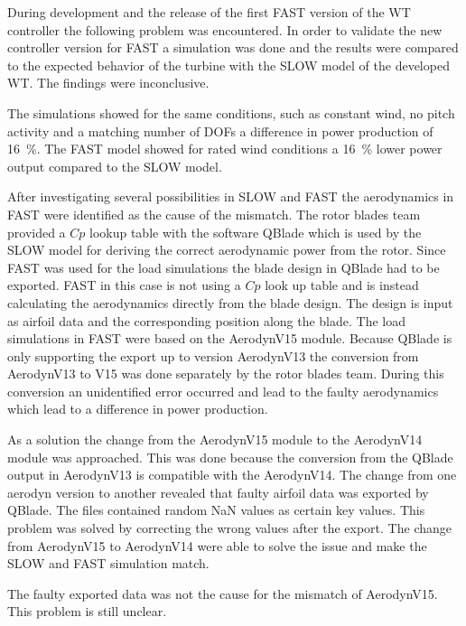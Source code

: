 During development and the release of the first \gls{FAST} version of the \gls{WT} controller the following problem was encountered.
In order to validate the new controller version for \gls{FAST} a simulation was done and the results were compared to the expected behavior of the turbine with the \gls{SLOW} model of the developed \gls{WT}.
The findings were inconclusive.

The simulations showed for the same conditions, such as constant wind, no pitch activity and a matching number of DOFs a difference in power production of \SI{16}{\%}.
The \gls{FAST} model showed for rated wind conditions a \SI{16}{\%} lower power output compared to the \gls{SLOW} model.

After investigating several possibilities in \gls{SLOW} and \gls{FAST} the aerodynamics in \gls{FAST} were identified as the cause of the mismatch.
The rotor blades team provided a $Cp$ lookup table with the software QBlade which is used by the \gls{SLOW} model for deriving the correct aerodynamic power from the rotor.
Since \gls{FAST} was used for the load simulations the blade design in QBlade had to be exported. \gls{FAST} in this case is not using a $Cp$ look up table and is instead calculating the aerodynamics directly from the blade design.
The design is input as airfoil data and the corresponding position along the blade.
The load simulations in FAST were based on the AerodynV15 module.
Because QBlade is only supporting the export up to version AerodynV13 the conversion from AerodynV13 to V15 was done separately by the rotor blades team.
During this conversion an unidentified error occurred and lead to the faulty aerodynamics which lead to a difference in power production.

As a solution the change from the AerodynV15 module to the AerodynV14 module was approached.
This was done because the conversion from the QBlade output in AerodynV13 is compatible with the AerodynV14.
The change from one aerodyn version to another revealed that faulty airfoil data was exported by QBlade.
The files contained random NaN values as certain key values.
This problem was solved by correcting the wrong values after the export.
The change from AerodynV15 to AerodynV14 were able to solve the issue and make the \gls{SLOW} and \gls{FAST} simulation match.

The faulty exported data was not the cause for the mismatch of AerodynV15. This problem is still unclear. 

